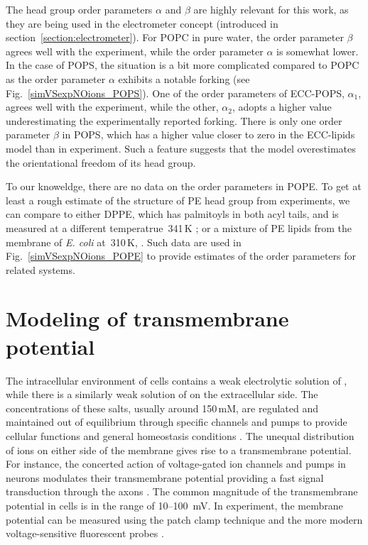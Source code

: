 The head group order parameters $\alpha$ and $\beta$ are highly relevant for this work,
as they are being used in the electrometer concept (introduced in section~\ref{section:electrometer}). 
For POPC in pure water, the order parameter $\beta$ agrees well with the experiment, 
while the order parameter $\alpha$ is somewhat lower. 
In the case of POPS, the situation is a bit more complicated
compared to POPC as the order parameter $\alpha$ exhibits a notable forking (see Fig.~\ref{simVSexpNOions_POPS}).
One of the order parameters of ECC-POPS, $\alpha_1$, agrees well with the experiment, 
while the other, $\alpha_2$, adopts a higher value underestimating the experimentally reported forking. 
There is only one order parameter $\beta$ in POPS, 
which has a higher value closer to zero in the ECC-lipids model than in experiment. 
Such a feature suggests that the model overestimates the orientational freedom of its head group. 

To our knoweldge, there are no data on the order parameters in POPE. 
To get at least a rough estimate of the structure of PE head group from experiments, 
we can compare to either DPPE, which has palmitoyls in both acyl tails, and is measured at a different temperatrue~341\,K \citep{seelig76, seelig80};
or a mixture of PE lipids from the membrane of \emph{E. coli} at~310\,K, \citep{gally81}. 
Such data are used in Fig.~\ref{simVSexpNOions_POPE} to provide estimates of the order parameters for related systems. 
 
 
 






\section{Modeling of transmembrane potential}

The intracellular environment of cells contains a weak electrolytic solution of , 
while there is a similarly weak solution of  on the extracellular side. 
The concentrations of these salts, usually around 150\,mM, 
are regulated and maintained out of equilibrium through specific channels and pumps 
to provide cellular functions and general homeostasis conditions \citep{Bezanilla2008, Knudsen_book2002}. 
The unequal distribution of ions on either side of the membrane
gives rise to a transmembrane potential. 
For instance, the concerted action of voltage-gated ion channels and pumps in neurons 
modulates their transmembrane potential
providing a fast signal transduction through the axons \citep{Knudsen_book2002, Storace2015, Sung2015}. 
The common magnitude of the transmembrane potential in cells is in the range of 10--100~mV. 
In experiment, the membrane potential can be measured using the patch clamp technique \citep{Bezanilla2008}
and the more modern voltage-sensitive fluorescent probes \citep{Storace2015, Sung2015}. 

